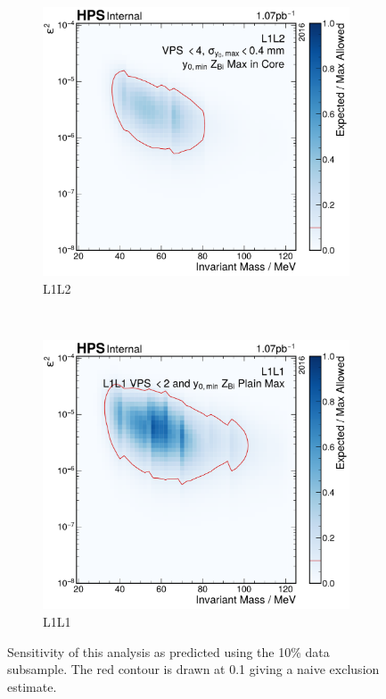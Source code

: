 \begin{figure}
  \centering
  \begin{subfigure}{0.48\textwidth}
    \includegraphics[width=\textwidth]{figures/hps/analysis/results/exclusion-estimate.pdf}
    \caption{L1L2}
    \label{fig:sensitivity:l1l2}
  \end{subfigure}
  ~
  \begin{subfigure}{0.48\textwidth}
    \includegraphics[width=\textwidth]{figures/hps/analysis/results/l1l1-exclusion-estimate.pdf}
    \caption{L1L1}
    \label{fig:sensitivity:l1l1}
  \end{subfigure}
  \caption{Sensitivity of this analysis as predicted using the 10\% data subsample.
  The red contour is drawn at 0.1 giving a naive exclusion estimate.}
  \label{fig:sensitivity}
\end{figure}

